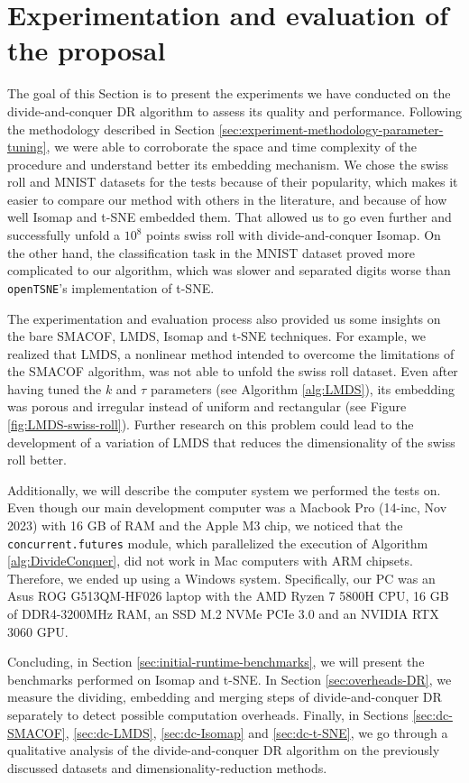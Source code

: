 \section{Experimentation and evaluation of the proposal}
\label{sec:experimentation-and-evaluation}

The goal of this Section is to present the experiments we have conducted on the divide-and-conquer DR algorithm to assess its quality and performance. Following the methodology described in Section \ref{sec:experiment-methodology-parameter-tuning}, we were able to corroborate the space and time complexity of the procedure and understand better its embedding mechanism. We chose the swiss roll and MNIST datasets for the tests because of their popularity, which makes it easier to compare our method with others in the literature, and because of how well Isomap and t-SNE embedded them. That allowed us to go even further and successfully unfold a $10^8$ points swiss roll with divide-and-conquer Isomap. On the other hand, the classification task in the MNIST dataset proved more complicated to our algorithm, which was slower and separated digits worse than \verb|openTSNE|'s implementation of t-SNE.

The experimentation and evaluation process also provided us some insights on the bare SMACOF, LMDS, Isomap and t-SNE techniques. For example, we realized that LMDS, a nonlinear method intended to overcome the limitations of the SMACOF algorithm, was not able to unfold the swiss roll dataset. Even after having tuned the $k$ and $\tau$ parameters (see Algorithm \ref{alg:LMDS}), its embedding was porous and irregular instead of uniform and rectangular (see Figure \ref{fig:LMDS-swiss-roll}). Further research on this problem could lead to the development of a variation of LMDS that reduces the dimensionality of the swiss roll better.

Additionally, we will describe the computer system we performed the tests on. Even though our main development computer was a  Macbook Pro (14-inc, Nov 2023) with 16 GB of RAM and the Apple M3 chip, we noticed that the \verb|concurrent.futures| module, which parallelized the execution of Algorithm \ref{alg:DivideConquer}, did not work in Mac computers with ARM chipsets. Therefore, we ended up using a Windows system. Specifically, our PC was an Asus ROG G513QM-HF026 laptop with the AMD Ryzen 7 5800H CPU, 16 GB of DDR4-3200MHz RAM, an SSD M.2 NVMe PCIe 3.0 and an NVIDIA RTX 3060 GPU.

Concluding, in Section \ref{sec:initial-runtime-benchmarks}, we will present the benchmarks performed on Isomap and t-SNE. In Section \ref{sec:overheads-DR}, we measure the dividing, embedding and merging steps of divide-and-conquer DR separately to detect possible computation overheads. Finally, in Sections \ref{sec:dc-SMACOF}, \ref{sec:dc-LMDS}, \ref{sec:dc-Isomap} and \ref{sec:dc-t-SNE}, we go through a qualitative analysis of the divide-and-conquer DR algorithm on the previously discussed datasets and dimensionality-reduction methods.


